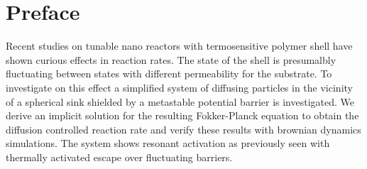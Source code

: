\section{Preface}
Recent studies on tunable nano reactors with termosensitive polymer shell have shown curious effects in reaction rates.
The state of the shell is presumalbly fluctuating between states with different permeability for the substrate.
To investigate on this effect a simplified system of diffusing particles in the vicinity of a spherical sink shielded by a metastable potential barrier is investigated. We derive an implicit solution for the resulting Fokker-Planck equation to obtain the diffusion controlled reaction rate and verify these results with brownian dynamics simulations. The system shows resonant activation as previously seen with thermally activated escape over fluctuating barriers.\\

\newpage
\tableofcontents
\newpage
